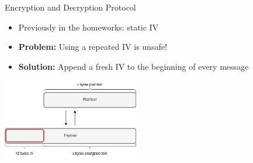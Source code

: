 \begin{frame}{Encryption and Decryption Protocol}
\begin{itemize}
\item Previously in the homeworks: static IV
\item \textbf{Problem:} Using a repeated IV is unsafe!
\item \textbf{Solution:} Append a fresh IV to the beginning of every message
\end{itemize}
\centering
\includegraphics[height = 3.5cm]{payload.png}
\end{frame}